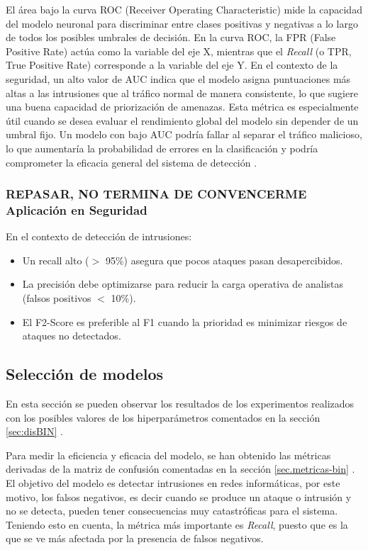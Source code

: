 \begin{itemize}
El área bajo la curva ROC (Receiver Operating Characteristic) mide la capacidad del modelo neuronal para discriminar entre clases positivas y negativas a lo largo de todos los posibles umbrales de decisión. 
En la curva ROC, la FPR (False Positive Rate) actúa como la variable del eje X, mientras que el \textit{Recall} (o TPR, True Positive Rate) corresponde a la variable del eje Y. En el contexto de la seguridad, un alto valor de AUC indica que el modelo asigna puntuaciones más altas a las intrusiones que al tráfico normal de manera consistente, lo que sugiere una buena capacidad de priorización de amenazas. Esta métrica es especialmente útil cuando se desea evaluar el rendimiento global del modelo sin depender de un umbral fijo. Un modelo con bajo AUC podría fallar al separar el tráfico malicioso, lo que aumentaría la probabilidad de errores en la clasificación y podría comprometer la eficacia general del sistema de detección \cite{fawcett2006introduction}.

\end{itemize}

\subsubsection{REPASAR, NO TERMINA DE CONVENCERME Aplicación en Seguridad}	\label{sec:apli-met-seg}
En el contexto de detección de intrusiones:
\begin{itemize}
    \item Un recall alto ($>$ 95\%) asegura que pocos ataques pasan desapercibidos.
    \item La precisión debe optimizarse para reducir la carga operativa de analistas (falsos positivos $<$ 10\%).
    \item El F2-Score es preferible al F1 cuando la prioridad es minimizar riesgos de ataques no detectados.
\end{itemize}


\subsection{Selección de modelos}
En esta sección se pueden observar los resultados de los experimentos realizados con los posibles valores de los hiperparámetros comentados en la sección \ref{sec:disBIN} .

Para medir la eficiencia y eficacia del modelo, se han obtenido las métricas derivadas de la matriz de confusión comentadas en la sección \ref{sec.metricas-bin} . El objetivo del modelo es detectar intrusiones en redes informáticas, por este motivo, los falsos negativos, es decir cuando se produce un ataque o intrusión y no se detecta, pueden tener consecuencias muy catastróficas para el sistema. Teniendo esto en cuenta, la métrica más importante es \textit{Recall}, puesto que es la que se ve más afectada por la presencia de falsos negativos.

